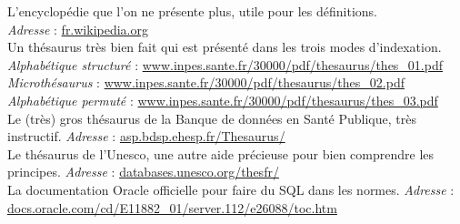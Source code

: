 \documentclass[a4paper, 12pt]{report}
\begin{document}
\renewcommand\bibname{Webographie}%
\begin{thebibliography}{2}
	L'encyclopédie que l'on ne présente plus, utile pour les définitions.\\
	\emph{Adresse} : \url{fr.wikipedia.org}
	~\\
	Un thésaurus très bien fait qui est présenté dans les trois modes d'indexation.\\
	\emph{Alphabétique structuré} : \url{www.inpes.sante.fr/30000/pdf/thesaurus/thes\_01.pdf}\\
	\emph{Microthésaurus} : \url{www.inpes.sante.fr/30000/pdf/thesaurus/thes\_02.pdf}\\
	\emph{Alphabétique permuté} : \url{www.inpes.sante.fr/30000/pdf/thesaurus/thes\_03.pdf}
	~\\
	Le (très) gros thésaurus de la Banque de données en Santé Publique, très instructif.
	\emph{Adresse} : \url{asp.bdsp.ehesp.fr/Thesaurus/}
	~\\
	Le thésaurus de l'Unesco, une autre aide précieuse pour bien comprendre les principes.
	\emph{Adresse} : \url{databases.unesco.org/thesfr/}
	~\\
	La documentation Oracle officielle pour faire du SQL dans les normes.
	\emph{Adresse} : \url{docs.oracle.com/cd/E11882_01/server.112/e26088/toc.htm}
\end{thebibliography}
\end{document}
